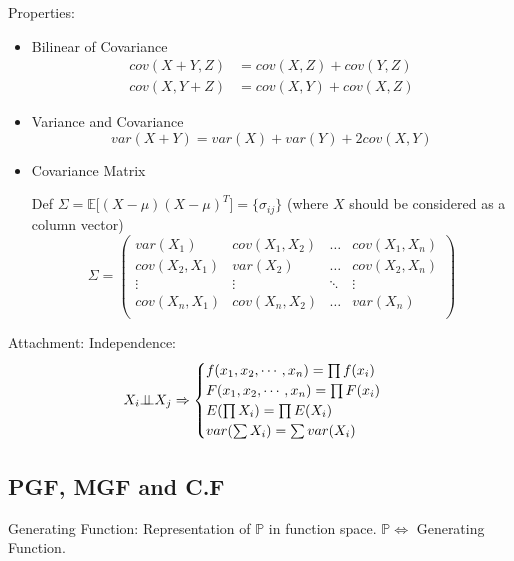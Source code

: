     Properties:
\begin{itemize}
\item Bilinear of Covariance\begin{align}
    cov(X+Y,Z)&=cov(X,Z)+cov(Y,Z)\\
    cov(X,Y+Z)&=cov(X,Y)+cov(X,Z)
\end{align}
    
\item Variance and Covariance
\begin{equation}\label{EqaVarOfSumOfRV}
    var(X+Y)=var(X)+var(Y)+2cov(X,Y)
\end{equation}
\item Covariance Matrix

    Def $\Sigma=\mathbb{E}\big[(X-\mu)(X-\mu)^T\big]=\{\sigma_{ij}\}$ (where $X$ should be considered as a column vector)
\begin{equation}\label{covariancematrix}
    \Sigma=
        \begin{pmatrix}
        var(X_1) & cov(X_1,X_2) & \ldots & cov(X_1,X_n)\\
        cov(X_2,X_1) & var(X_2) & \ldots & cov(X_2,X_n)\\
        \vdots & \vdots & \ddots & \vdots\\
        cov(X_n,X_1) & cov(X_n,X_2) & \ldots & var(X_n)\\
        \end{pmatrix}    
    \end{equation}
\end{itemize}

Attachment: Independence:\begin{equation}    X_i \bot\!\!\!\bot X_j\Rightarrow \begin{cases}
        f(x_1,x_2,\cdots,x_n)=\prod f(x_i)\\
        F(x_1,x_2,\cdots,x_n)=\prod F(x_i)\\
        E(\prod X_i)=\prod E(X_i)\\
        var(\sum X_i)=\sum var(X_i)
    \end{cases}
\end{equation}


\subsection{PGF, MGF and C.F}\label{SectionPGFMGFCF}

    Generating Function: Representation of $\mathbb{P}$ in function space. $\mathbb{P}\Leftrightarrow$ Generating Function.

